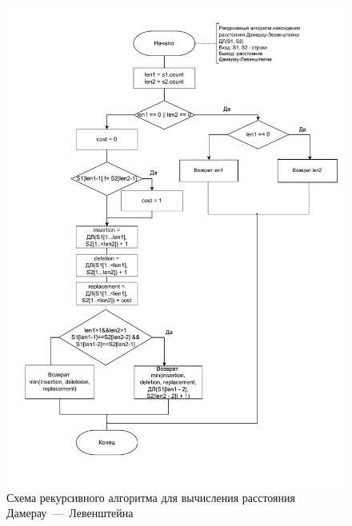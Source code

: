 \begin{figure}[h]
	\centering
	\includegraphics[height=0.8\textheight]{img/recursiveDLevenshtein.pdf}
	\caption{Схема рекурсивного алгоритма для вычисления расстояния Дамерау~---~Левенштейна}
	\label{fig:DLrec}
\end{figure}

\clearpage

